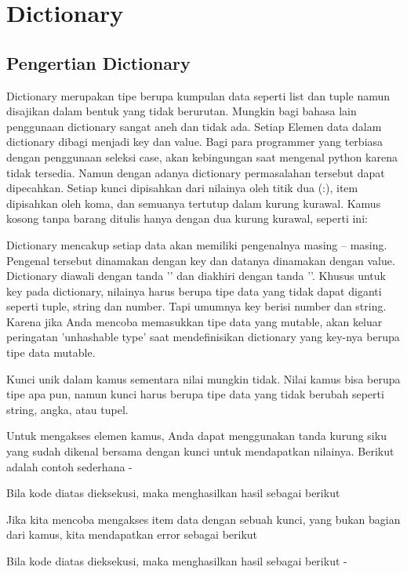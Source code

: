 \section{Dictionary}
\subsection{Pengertian Dictionary}
Dictionary merupakan tipe berupa kumpulan data seperti list dan tuple namun disajikan dalam bentuk yang tidak berurutan. Mungkin bagi bahasa lain penggunaan 
dictionary sangat aneh dan tidak ada. Setiap Elemen data dalam dictionary dibagi menjadi key dan value. Bagi para programmer yang terbiasa dengan penggunaan seleksi case, akan kebingungan saat mengenal 
python karena tidak tersedia. Namun dengan adanya dictionary permasalahan tersebut dapat dipecahkan.
Setiap kunci dipisahkan dari nilainya oleh titik dua (:), item dipisahkan oleh koma, dan semuanya tertutup dalam kurung kurawal. Kamus kosong tanpa barang ditulis hanya dengan dua kurung kurawal, seperti ini: 

Dictionary mencakup setiap data akan memiliki pengenalnya masing – masing. Pengenal tersebut dinamakan dengan key dan datanya dinamakan dengan value.
Dictionary diawali dengan tanda '{' dan diakhiri dengan tanda '}'. Khusus untuk key pada dictionary, nilainya harus berupa tipe data yang tidak dapat diganti seperti tuple, string dan number. Tapi umumnya key berisi number dan string. Karena jika Anda mencoba memasukkan tipe data yang mutable, akan keluar peringatan 'unhashable type' saat mendefinisikan dictionary yang key-nya
berupa tipe data mutable.

Kunci unik dalam kamus sementara nilai mungkin tidak. Nilai kamus bisa berupa tipe apa pun, namun kunci harus berupa tipe data yang tidak berubah seperti string, angka, atau tupel. \par

Untuk mengakses elemen kamus, Anda dapat menggunakan tanda kurung siku yang sudah dikenal bersama dengan kunci untuk mendapatkan nilainya. Berikut adalah contoh sederhana - \par

Bila kode diatas dieksekusi, maka menghasilkan hasil sebagai berikut 

Jika kita mencoba mengakses item data dengan sebuah kunci, yang bukan bagian dari kamus, kita mendapatkan error sebagai berikut 

Bila kode diatas dieksekusi, maka menghasilkan hasil sebagai berikut - 

